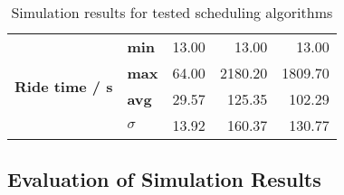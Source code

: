 \begin{table}[]
\begin{tabular}{llrrr}
\multirow{4}{*}{\textbf{Ride time / s}}        & \textbf{min}        & 13.00                                                                                                                                             & 13.00                                                                                                                                             & 13.00                                                                                                                                           \\
                                               & \textbf{max}        & 64.00                                                                                                                                             & 2180.20                                                                                                                                           & 1809.70                                                                                                                                         \\
                                               & \textbf{avg}        & 29.57                                                                                                                                             & 125.35                                                                                                                                            & 102.29                                                                                                                                          \\
                                               & \textbf{$ \sigma $} & 13.92                                                                                                                                             & 160.37                                                                                                                                            & 130.77                                                                                                                                         
\end{tabular}
\caption{\label{tab:impl:simulationresults} Simulation results for tested scheduling algorithms}
\end{table}
\endgroup

\newpage

\subsection{Evaluation of Simulation Results}

